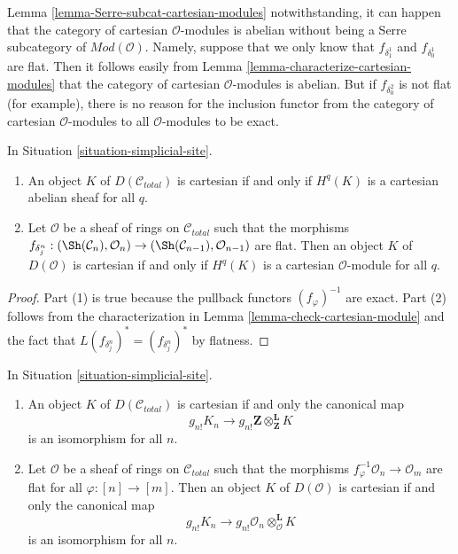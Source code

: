 \begin{remark}[Warning]
\label{remark-warning-cartesian-modules}
Lemma \ref{lemma-Serre-subcat-cartesian-modules} notwithstanding, it
can happen that the category of cartesian $\mathcal{O}$-modules is
abelian without being a Serre subcategory of $\textit{Mod}(\mathcal{O})$.
Namely, suppose that we only know that
$f_{\delta_1^1}$ and $f_{\delta_0^1}$ are flat.
Then it follows easily from
Lemma \ref{lemma-characterize-cartesian-modules}
that the category of cartesian $\mathcal{O}$-modules is abelian.
But if $f_{\delta_0^2}$ is not flat (for example),
there is no reason for the inclusion functor
from the category of cartesian $\mathcal{O}$-modules
to all $\mathcal{O}$-modules to be exact.
\end{remark}

\begin{lemma}
\label{lemma-derived-cartesian-modules}
In Situation \ref{situation-simplicial-site}.
\begin{enumerate}
\item An object $K$ of $D(\mathcal{C}_{total})$ is cartesian if and only
if $H^q(K)$ is a cartesian abelian sheaf for all $q$.
\item Let $\mathcal{O}$ be a sheaf
of rings on $\mathcal{C}_{total}$ such that the morphisms
$f_{\delta^n_j} : (\Sh(\mathcal{C}_n), \mathcal{O}_n)
\to (\Sh(\mathcal{C}_{n - 1}), \mathcal{O}_{n - 1})$ are flat.
Then an object $K$ of $D(\mathcal{O})$ is cartesian if and only
if $H^q(K)$ is a cartesian $\mathcal{O}$-module for all $q$.
\end{enumerate}
\end{lemma}

\begin{proof}
Part (1) is true because the pullback functors $(f_\varphi)^{-1}$
are exact. Part (2) follows from the characterization in
Lemma \ref{lemma-check-cartesian-module}
and the fact that $L(f_{\delta^n_j})^* = (f_{\delta^n_j})^*$
by flatness.
\end{proof}

\begin{lemma}
\label{lemma-derived-cartesian-shriek}
In Situation \ref{situation-simplicial-site}.
\begin{enumerate}
\item An object $K$ of $D(\mathcal{C}_{total})$ is cartesian if and only
the canonical map
$$
g_{n!}K_n \longrightarrow
g_{n!}\mathbf{Z} \otimes^\mathbf{L}_\mathbf{Z} K
$$
is an isomorphism for all $n$.
\item Let $\mathcal{O}$ be a sheaf of rings on $\mathcal{C}_{total}$
such that the morphisms $f_\varphi^{-1}\mathcal{O}_n \to \mathcal{O}_m$
are flat for all $\varphi : [n] \to [m]$. Then an object $K$ of
$D(\mathcal{O})$ is cartesian if and only the canonical map
$$
g_{n!}K_n \longrightarrow
g_{n!}\mathcal{O}_n \otimes^\mathbf{L}_\mathcal{O} K
$$
is an isomorphism for all $n$.
\end{enumerate}
\end{lemma}

